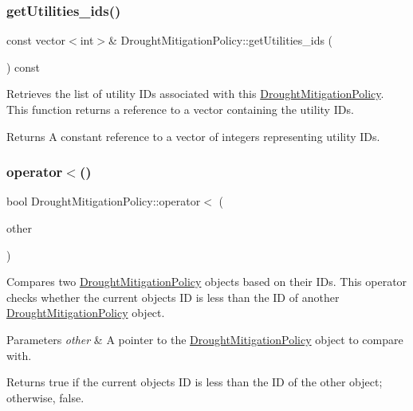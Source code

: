 \subsubsection{\texorpdfstring{get\+Utilities\+\_\+ids()}{getUtilities\_ids()}}
{\footnotesize\ttfamily const vector$<$int$>$\& Drought\+Mitigation\+Policy\+::get\+Utilities\+\_\+ids (\begin{DoxyParamCaption}{ }\end{DoxyParamCaption}) const}



Retrieves the list of utility I\+Ds associated with this \mbox{\hyperlink{classDroughtMitigationPolicy}{Drought\+Mitigation\+Policy}}. This function returns a reference to a vector containing the utility I\+Ds. 

\begin{DoxyReturn}{Returns}
A constant reference to a vector of integers representing utility I\+Ds. 
\end{DoxyReturn}
\mbox{\label{classDroughtMitigationPolicy_a0bf7d0fa94377ae6814e529daf0204c4}} 
\subsubsection{\texorpdfstring{operator$<$()}{operator<()}}
{\footnotesize\ttfamily bool Drought\+Mitigation\+Policy\+::operator$<$ (\begin{DoxyParamCaption}\item[{const \mbox{\hyperlink{classDroughtMitigationPolicy}{Drought\+Mitigation\+Policy}} $\ast$}]{other }\end{DoxyParamCaption})}



Compares two \mbox{\hyperlink{classDroughtMitigationPolicy}{Drought\+Mitigation\+Policy}} objects based on their I\+Ds. This operator checks whether the current object\textquotesingle{}s ID is less than the ID of another \mbox{\hyperlink{classDroughtMitigationPolicy}{Drought\+Mitigation\+Policy}} object. 


\begin{DoxyParams}{Parameters}
{\em other} & A pointer to the \mbox{\hyperlink{classDroughtMitigationPolicy}{Drought\+Mitigation\+Policy}} object to compare with.\\
\hline
\end{DoxyParams}
\begin{DoxyReturn}{Returns}
{\ttfamily true} if the current object\textquotesingle{}s ID is less than the ID of the other object; otherwise, {\ttfamily false}. 
\end{DoxyReturn}
\mbox{\label{classDroughtMitigationPolicy_a576d3ddb09dc9372898a63c0949d08a6}} 
